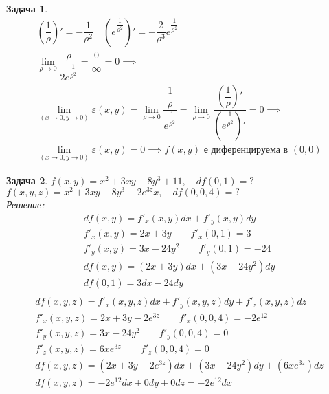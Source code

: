 \documentclass[a4paper,fleqn,12pt]{article}
\newtheorem{task}{Задача}[section]
\begin{document}
\begin{task}
\begin{gather*}
\left( \dfrac{1}{\rho} \right)' = -\dfrac{1}{\rho^2} \quad \left( e^{\dfrac{1}{\rho^2}} \right)' = -\dfrac{2}{\rho^3} e^{\dfrac{1}{\rho^2}} \\
\lim\limits_ {\rho \to 0} \dfrac{\rho}{2e^{\dfrac{1}{\rho^2}}} = \dfrac{0}{\infty} = 0 \implies \\
\lim\limits_ {(x \to 0, y \to 0)} \varepsilon (x,y) = \lim\limits_ {\rho \to 0} \dfrac{\dfrac{1}{\rho}}{e^{\dfrac{1}{\rho^2}}} = \lim\limits_ {\rho \to 0} \dfrac{\left( \dfrac{1}{\rho} \right)'}{\left( e^{\dfrac{1}{\rho^2}}\right)'} = 0
\implies \\
\lim\limits_ {(x \to 0, y \to 0)} \varepsilon (x,y) = 0 \implies f(x,y) \text{ е диференцируема в } (0,0)
\end{gather*}
\end{task}


\begin{task}
$f(x,y) = x^2 + 3xy - 8y^3 + 11, \quad df(0,1) =?$\\
$f(x,y,z) = x^2 + 3xy - 8y^3 - 2e^{3z}x, \quad df(0,0,4) = ? $\\
Решение: \\
\begin{gather*}
df(x,y) = f'_x(x,y)dx + f'_y(x,y)dy\\
f'_x(x,y) = 2x + 3y \qquad f'_x(0,1) = 3\\
f'_y(x,y) = 3x - 24y^2 \qquad f'_y(0,1) = -24\\
df(x,y) = (2x + 3y)dx + (3x - 24y^2)dy\\
df(0,1) = 3dx - 24dy\\
\end{gather*}
\begin{gather*}
df(x,y,z) = f'_x(x,y,z)dx + f'_y(x,y,z)dy +  f'_z(x,y,z)dz\\
f'_x(x,y,z) = 2x + 3y - 2e^{3z} \qquad f'_x(0,0,4) = - 2e^{12}\\
f'_y(x,y,z) = 3x - 24y^2 \qquad f'_y(0,0,4) = 0\\
f'_z(x,y,z) = 6xe^{3z} \qquad f'_z(0,0,4) = 0\\
df(x,y,z) =(2x + 3y - 2e^{3z})dx + (3x - 24y^2)dy +  (6xe^{3z})dz\\
df(x,y,z) = - 2e^{12}dx + 0dy + 0dz = - 2e^{12}dx
\end{gather*}

\end{task}
\end{document}
